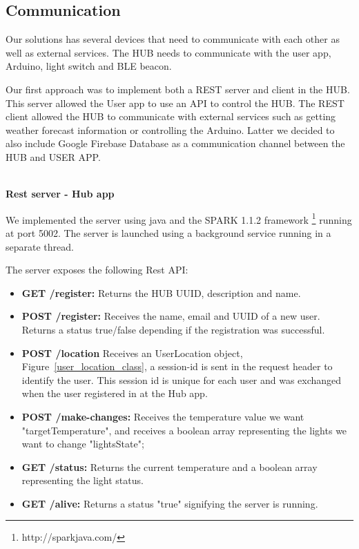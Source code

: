 \subsection{Communication}

Our solutions has several devices that need to communicate with each other as well as external services.
The HUB needs to communicate with the user app, Arduino, light switch and \ac{BLE} beacon. 

Our first approach was to implement both a \ac{REST} server and client in the HUB. This server allowed the User app to use an \ac{API} to control the HUB. The \ac{REST} client allowed the HUB to communicate with external services such as getting weather forecast information or controlling the Arduino.
Latter we decided to also include Google Firebase Database as a communication channel between the HUB and USER APP.


\mbox{}\\
\textbf{Rest server - Hub app}

We implemented the server using java and the SPARK 1.1.2 framework \footnote{http://sparkjava.com/} running at port 5002. The server is launched using a background service running in a separate thread.

The server exposes the following Rest API: 

\begin{itemize}
  \item \textbf{GET /register:} Returns the HUB UUID, description and name.
  \item \textbf{POST /register:} Receives the name, email and UUID of a new user. Returns a status true/false depending if the registration was successful.
  \item \textbf{POST /location} Receives an UserLocation object, Figure~\ref{user_location_class}, a session-id is sent in the request header to identify the user. This session id is unique for each user and was exchanged when the user registered in at the Hub app.
  \item \textbf{POST /make-changes:} Receives the temperature value we want "targetTemperature", and receives a boolean array representing the lights we want to change "lightsState";
   \item \textbf{GET /status:} Returns the current temperature and a boolean array representing the light status.
   \item \textbf{GET /alive:} Returns a status "true" signifying the server is running.
\end{itemize}

